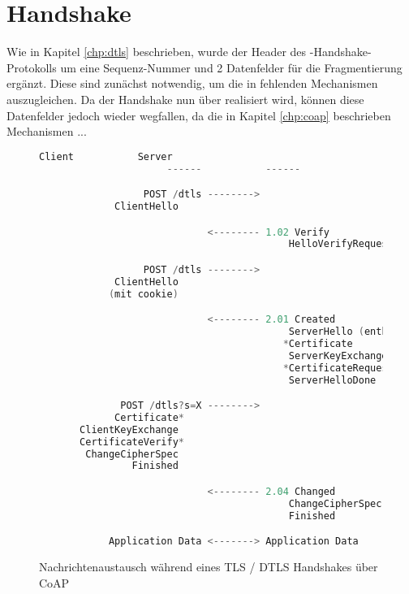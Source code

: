 \section{Handshake}

Wie in Kapitel \ref{chp:dtls} beschrieben, wurde der Header des -Handshake-Protokolls um eine Sequenz-Nummer
und 2 Datenfelder für die Fragmentierung ergänzt. Diese sind zunächst notwendig, um die in  fehlenden Mechanismen
auszugleichen. Da der Handshake nun über  realisiert wird, können diese Datenfelder jedoch wieder wegfallen, da die
in Kapitel \ref{chp:coap} beschrieben Mechanismen ... 

\begin{figure}[ht]
  \centering
  \begin{lstlisting}[language=c]
                      Client           Server
                      ------           ------

                  POST /dtls -------->
             ClientHello

                             <-------- 1.02 Verify
                                           HelloVerifyRequest

                  POST /dtls -------->
             ClientHello
            (mit cookie)

                             <-------- 2.01 Created
                                           ServerHello (enthält Session X)
                                          *Certificate
                                           ServerKeyExchange
                                          *CertificateRequest
                                           ServerHelloDone

              POST /dtls?s=X -------->
             Certificate*
       ClientKeyExchange
       CertificateVerify*
        ChangeCipherSpec
                Finished

                             <-------- 2.04 Changed
                                           ChangeCipherSpec
                                           Finished

            Application Data <-------> Application Data
  \end{lstlisting}
  \caption{Nachrichtenaustausch während eines TLS / DTLS Handshakes über CoAP}
  \label{fig:newhandshake}
\end{figure}
